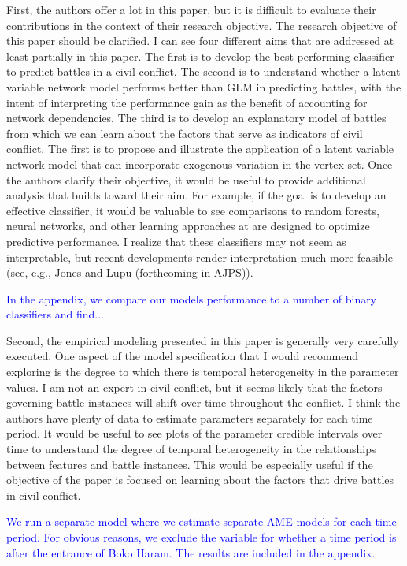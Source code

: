 \documentclass[12pt,onesided,fullpage]{amsart}
\begin{document}
First, the authors offer a lot in this paper, but it is difficult to evaluate their contributions in the context of their research objective. The research objective of this paper should be clarified. I can see four different aims that are addressed at least partially in this paper. The first is to develop the best performing classifier to predict battles in a civil conflict. The second is to understand whether a latent variable network model performs better than GLM in predicting battles, with the intent of interpreting the performance gain as the benefit of accounting for network dependencies. The third is to develop an explanatory model of battles from which we can learn about the factors that serve as indicators of civil conflict. The first is to propose and illustrate the application of a latent variable network model that can incorporate exogenous variation in the vertex set. Once the authors clarify their objective, it would be useful to provide additional analysis
that builds toward their aim. For example, if the goal is to develop an effective classifier, it would be valuable to see comparisons to random forests, neural networks, and other learning approaches at are designed to optimize predictive performance. I realize that these classifiers may not seem as interpretable, but recent developments render interpretation much more feasible (see, e.g., Jones and Lupu (forthcoming in AJPS)).

\textcolor{blue}{In the appendix, we compare our models performance to a number of binary classifiers and find...}


Second, the empirical modeling presented in this paper is generally very carefully executed. One aspect of the model specification that I would recommend exploring is the degree to which there is temporal heterogeneity in the parameter values. I am not an expert in civil conflict, but it seems likely that the factors governing battle instances will shift over time throughout the conflict. I think the authors have plenty of data to estimate parameters separately for each time period. It would be useful to see plots of the parameter credible intervals over time to understand the degree of temporal heterogeneity in the relationships between features and battle instances. This would be especially useful if the objective of the paper is focused on learning about the factors that drive battles in civil conflict.

\textcolor{blue}{We run a separate model where we estimate separate AME models for each time period. For obvious reasons, we exclude the variable for whether a time period is after the entrance of Boko Haram. The results are included in the appendix.} 
\end{document}
